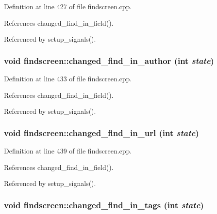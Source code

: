 Definition at line 427 of file findscreen.cpp.

References changed\_\-find\_\-in\_\-field().

Referenced by setup\_\-signals().
\subsubsection{\setlength{\rightskip}{0pt plus 5cm}void findscreen::changed\_\-find\_\-in\_\-author (int {\em state})\hspace{0.3cm}{\tt  [private, slot]}}\label{classfindscreen_77ff1dca52c3303408c687f4c2df67f8}




Definition at line 433 of file findscreen.cpp.

References changed\_\-find\_\-in\_\-field().

Referenced by setup\_\-signals().
\subsubsection{\setlength{\rightskip}{0pt plus 5cm}void findscreen::changed\_\-find\_\-in\_\-url (int {\em state})\hspace{0.3cm}{\tt  [private, slot]}}\label{classfindscreen_4534d3e6d5589cbc2e52d2e32af4dbe1}




Definition at line 439 of file findscreen.cpp.

References changed\_\-find\_\-in\_\-field().

Referenced by setup\_\-signals().
\subsubsection{\setlength{\rightskip}{0pt plus 5cm}void findscreen::changed\_\-find\_\-in\_\-tags (int {\em state})\hspace{0.3cm}{\tt  [private, slot]}}\label{classfindscreen_8c8f7af934b1e578fc88a9854198961b}




